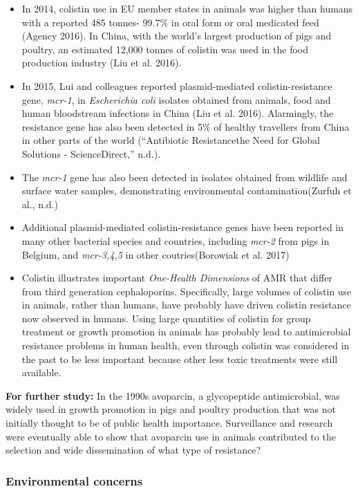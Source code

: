 \documentclass[]{tufte-handout}
\begin{document}
\begin{itemize}
\item
  In 2014, colistin use in EU member states in animals was higher than
  humans with a reported 485 tonnes- 99.7\% in oral form or oral
  medicated feed (Agency 2016). In China, with the world's largest
  production of pigs and poultry, an estimated 12,000 tonnes of colistin
  was used in the food production industry (Liu et al. 2016).
\item
  In 2015, Lui and colleagues reported plasmid-mediated
  colistin-resistance gene, \emph{mcr-1}, in \emph{Escherichia coli}
  isolates obtained from animals, food and human bloodstream infections
  in China (Liu et al. 2016). Alarmingly, the resistance gene has also
  been detected in 5\% of healthy travellers from China in other parts
  of the world ({``Antibiotic Resistance\textemdash the Need for Global
  Solutions - {ScienceDirect},''} n.d.).
\item
  The \emph{mcr-1} gene has also been detected in isolates obtained from
  wildlife and surface water samples, demonstrating environmental
  contamination(Zurfuh et al., n.d.)
\item
  Additional plasmid-mediated colistin-resistance genes have been
  reported in many other bacterial species and countries, including
  \emph{mcr-2} from pigs in Belgium, and \emph{mcr-3,4,5} in other
  coutries(Borowiak et al. 2017)
\item
  Colistin illustrates important \emph{One-Health Dimensions} of AMR
  that differ from third generation cephaloporins. Specifically, large
  volumes of colistin use in animals, rather than humans, have probably
  have driven colistin resistance now observed in humans. Using large
  quantities of colistin for group treatment or growth promotion in
  animals has probably lead to antimicrobial resistance problems in
  human health, even through colistin was considered in the past to be
  less important because other less toxic treatments were still
  available.
\end{itemize}

\textbf{For further study:} In the 1990s avoparcin, a glycopeptide
antimicrobial, was widely used in growth promotion in pigs and poultry
production that was not initially thought to be of public health
importance. Surveillance and research were eventually able to show that
avoparcin use in animals contributed to the selection and wide
dissemination of what type of resistance?

\hypertarget{environmental-concerns}{%
\subsubsection*{Environmental concerns}\label{environmental-concerns}}
\end{document}
